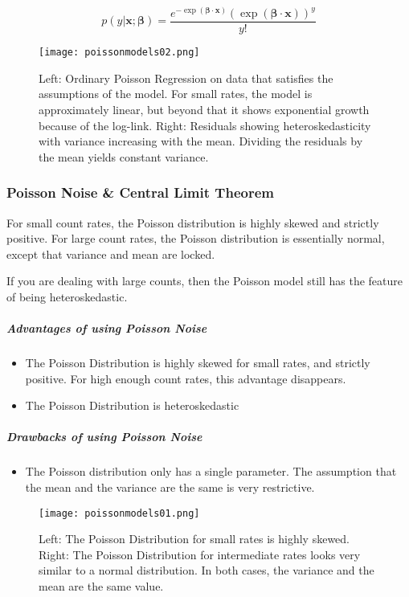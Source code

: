 \begin{equation}
p(y|\mathbf{x};\mathbf{\beta}) = \frac{e^{-\exp(\mathbf{\beta\cdot x})} (\exp(\mathbf{\beta\cdot x}))^{y}}{y!}
\end{equation}


\begin{figure}
\centering
    \texttt{[image: poissonmodels02.png]}
    \caption{Left: Ordinary Poisson Regression on data that satisfies the assumptions of the model. For small rates, the model is approximately linear, but beyond that it shows exponential growth because of the log-link. Right: Residuals showing heteroskedasticity with variance increasing with the mean. Dividing the residuals by the mean yields constant variance.}
    \label{fig:ordinarypoisson}
\end{figure}


\subsubsection{Poisson Noise \& Central Limit Theorem}

For small count rates, the Poisson distribution is highly skewed and strictly positive. For large count rates, the Poisson distribution is essentially normal, except that variance and mean are locked.

If you are dealing with large counts, then the Poisson model still has the feature of being heteroskedastic.

\subparagraph{Advantages of using Poisson Noise}

\begin{itemize}
\item The Poisson Distribution is highly skewed for small rates, and strictly positive. For high enough count rates, this advantage disappears.
\item The Poisson Distribution is heteroskedastic
\end{itemize}

\subparagraph{Drawbacks of using Poisson Noise}

\begin{itemize}
\item The Poisson distribution only has a single parameter. The assumption that the mean and the variance are the same is very restrictive.
\end{itemize}


\begin{figure}
\centering
    \texttt{[image: poissonmodels01.png]}
    \caption{Left: The Poisson Distribution for small rates is highly skewed. Right: The Poisson Distribution for intermediate rates looks very similar to a normal distribution. In both cases, the variance and the mean are the same value.}
    \label{fig:poissonandcentrallimit}
\end{figure}


